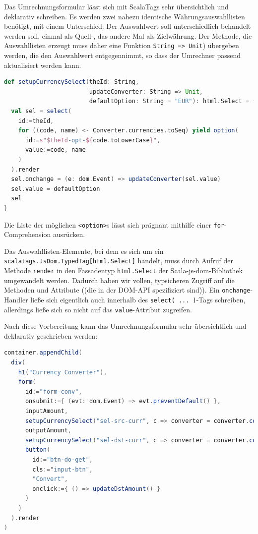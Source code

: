 \documentclass[a4paper, 12pt, hidelinks, listof=totoc, listoftables=totoc, bibliography=totoc]{scrreprt}
\begin{document}
Das Umrechnungsformular lässt sich mit ScalaTags sehr übersichtlich und deklarativ schreiben. Es werden zwei nahezu identische Währungsauswahllisten benötigt, mit einem Unterschied: Der Auswahlwert soll unterschiedlich behandelt werden soll, einmal als Quell-, das andere Mal als Zielwährung. Der Methode, die Auswahllisten erzeugt muss daher eine Funktion \texttt{String => Unit}) übergeben werden, die den Auswahlwert entgegennimmt, so dass der Umrechner passend aktualisiert werden kann.

\begin{lstlisting}[language=Scala]
def setupCurrencySelect(theId: String,
                        updateConverter: String => Unit,
                        defaultOption: String = "EUR"): html.Select = {
  val sel = select(
    id:=theId,
    for ((code, name) <- Converter.currencies.toSeq) yield option(
      id:=s"$theId-opt-${code.toLowerCase}",
      value:=code, name
    )
  ).render
  sel.onchange = (e: dom.Event) => updateConverter(sel.value)
  sel.value = defaultOption
  sel
}
\end{lstlisting}

Die Liste der möglichen \texttt{<option>}s lässt sich prägnant mithilfe einer \texttt{for}-Comprehension ausrücken.

Das Auswahllisten-Elemente, bei dem es sich um ein \texttt{scalatags.JsDom.TypedTag[html.Select]} handelt, muss durch Aufruf der Methode \texttt{render} in den Fassadentyp \texttt{html.Select} der Scala-js-dom-Bibliothek umgewandelt werden. Dadurch haben wir vollen, typsicheren Zugriff auf die Methoden und Attribute ((die in der DOM-API spezifiziert sind)). Ein \texttt{onchange}-Handler ließe sich eigentlich auch innerhalb des \texttt{select( ... )}-Tags schreiben, allerdings ließe sich so nicht auf das \texttt{value}-Attribut zugreifen.

Nach diese Vorbereitung kann das Umrechnungsformular sehr übersichtlich und deklarativ geschrieben werden:

\begin{lstlisting}[language=Scala]
container.appendChild(
  div(
    h1("Currency Converter"),
    form(
      id:="form-conv",
      onsubmit:={ (evt: dom.Event) => evt.preventDefault() },
      inputAmount,
      setupCurrencySelect("sel-src-curr", c => converter = converter.copy(srcCurr = c)),
      outputAmount,
      setupCurrencySelect("sel-dst-curr", c => converter = converter.copy(dstCurr = c)),
      button(
        id:="btn-do-get",
        cls:="input-btn",
        "Convert",
        onclick:={ () => updateDstAmount() }
      )
    )
  ).render
)
\end{lstlisting}
\end{document}
